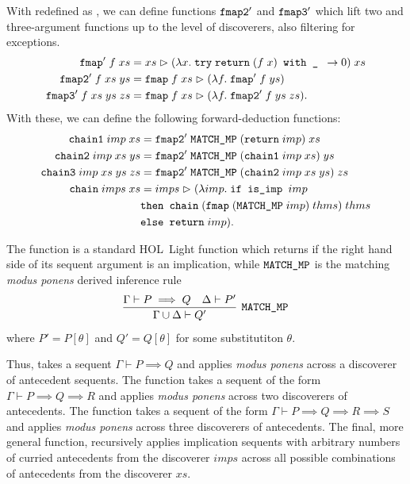 With  redefined as , we can define functions $\texttt{fmap2}'$ and $\texttt{fmap3}'$ which lift two and three-argument functions up to the level of discoverers, also filtering for exceptions.
\begin{align*}
\texttt{fmap}'\;f\;xs &= xs \vartriangleright (\lambda x.\;\texttt{try}\; \texttt{return}\;(f\;x)  \texttt{ with \_ } \rightarrow 0)\;xs\\
\texttt{fmap2}'\;f\;xs\;ys &= \texttt{fmap}\;f\;xs \vartriangleright (\lambda f.\;\texttt{fmap}'\;f\;ys)\\
\texttt{fmap3}'\;f\;xs\;ys\;zs &= \texttt{fmap}\;f\;xs \vartriangleright (\lambda f.\;\texttt{fmap2}'\;f\;ys\;zs).
\end{align*}
With these, we can define the following forward-deduction functions:
\begin{align*}
\texttt{chain1}\;imp\;xs &= \texttt{fmap2}'\; \texttt{MATCH\_MP}\; (\texttt{return}\;imp)\;xs \\
\texttt{chain2}\;imp\;xs\;ys &= \texttt{fmap2}'\; \texttt{MATCH\_MP}\; (\texttt{chain1}\; imp\;xs)\;ys\\
\texttt{chain3}\;imp\;xs\;ys\;zs &= \texttt{fmap2}'\; \texttt{MATCH\_MP}\; (\texttt{chain2}\;imp\;xs\;ys)\;zs\\
\texttt{chain}\;imps\;xs &= imps \vartriangleright (\lambda imp.\;\texttt{if is\_imp } imp\\ &\texttt{then } \texttt{chain}\;(\texttt{fmap}\;(\texttt{MATCH\_MP}\;imp)\;thms)\;thms\\
&\texttt{else } \texttt{return}\; imp).
\end{align*}

The function  is a standard HOL~Light function which returns  if the right hand side of its sequent argument is an implication, while $\texttt{MATCH\_MP}$ is the matching \emph{modus ponens} derived inference rule
\begin{displaymath}\infer[\code{MATCH\_MP}]{\Gamma\cup\Delta \vdash Q'}{\Gamma \vdash P \implies Q&\Delta \vdash P'}
\end{displaymath}
where $P'=P[\theta]$ and $Q'=Q[\theta]$ for some substitutiton $\theta$. 

Thus,  takes a sequent $\Gamma \vdash P \implies Q$ and applies \emph{modus ponens} across a discoverer of antecedent sequents. The function  takes a sequent of the form $\Gamma \vdash P \implies Q \implies R$ and applies \emph{modus ponens} across two discoverers of antecedents. The function  takes a sequent of the form $\Gamma \vdash P \implies Q \implies R \implies S$ and applies \emph{modus ponens} across three discoverers of antecedents. The final, more general  function, recursively applies implication sequents with arbitrary numbers of curried antecedents from the discoverer $imps$ across all possible combinations of antecedents from the discoverer $xs$.%

